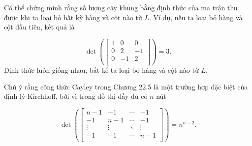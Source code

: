 Có thể chứng minh rằng
số lượng cây khung bằng
định thức của ma trận thu được
khi ta loại bỏ bất kỳ hàng và cột nào từ $L$.
Ví dụ, nếu ta loại bỏ hàng
và cột đầu tiên, kết quả là

\[ \det(
\begin{bmatrix}
  1 & 0 & 0 \\
  0 & 2 & -1 \\
  0 & -1 & 2 \\
 \end{bmatrix}
) =3.\]
Định thức luôn giống nhau,
bất kể ta loại bỏ hàng và cột nào từ $L$.

Chú ý rằng công thức Cayley trong Chương 22.5 là
một trường hợp đặc biệt của định lý Kirchhoff,
bởi vì trong đồ thị đầy đủ có $n$ nút

\[ \det(
\begin{bmatrix}
  n-1 & -1 & \cdots & -1 \\
  -1 & n-1 & \cdots & -1 \\
  \vdots & \vdots & \ddots & \vdots \\
  -1 & -1 & \cdots & n-1 \\
 \end{bmatrix}
) =n^{n-2}.\]



